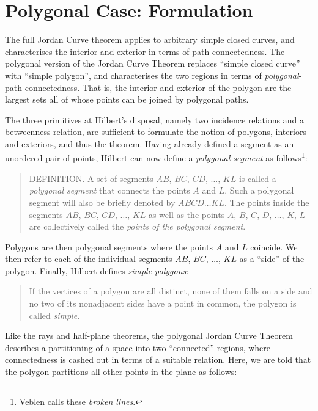 \section{Polygonal Case: Formulation}\label{sec:JordanCurveExplanation}
The full Jordan Curve theorem applies to arbitrary simple closed curves, and characterises the interior and exterior in terms of path-connectedness. The polygonal version of the Jordan Curve Theorem replaces ``simple closed curve'' with ``simple polygon'', and characterises the two regions in terms of \emph{polygonal}-path connectedness. That is, the interior and exterior of the polygon are the largest sets all of whose points can be joined by polygonal paths. 

The three primitives at Hilbert's disposal, namely two incidence relations and a betweenness relation, are sufficient to formulate the notion of polygons, interiors and exteriors, and thus the theorem. Having already defined a segment as an unordered pair of points, Hilbert can now define a \emph{polygonal segment} as follows\footnote{Veblen calls these \emph{broken lines}.}:

\begin{quote}
DEFINITION. A set of segments $AB$, $BC$, $CD$, $\ldots$, $KL$ is called a \emph{polygonal segment} that connects the points $A$ and $L$. Such a polygonal segment will also be briefly denoted by $ABCD\ldots KL$. The points inside the segments $AB$, $BC$, $CD$, $\ldots$, $KL$ as well as the points $A$, $B$, $C$, $D$, $\ldots$, $K$, $L$ are collectively called the \emph{points of the polygonal segment}. 
\end{quote}

Polygons are then polygonal segments where the points $A$ and $L$ coincide. We then refer to each of the individual segments $AB$, $BC$, $\ldots$, $KL$ as a ``side'' of the polygon. Finally, Hilbert defines \emph{simple polygons}:

\begin{quote}
If the vertices of a polygon are all distinct, none of them falls on a side and no two of its nonadjacent sides have a point in common, the polygon is called \emph{simple}.
\end{quote}

Like the rays and half-plane theorems, the polygonal Jordan Curve Theorem describes a partitioning of a space into two ``connected'' regions, where connectedness is cashed out in terms of a suitable relation. Here, we are told that the polygon partitions all other points in the plane as follows:

